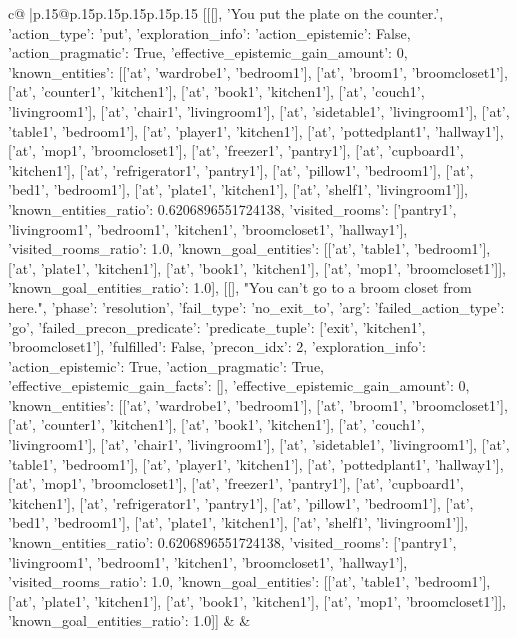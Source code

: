 \documentclass{article}
\begin{document}
{\begin{supertabular}{c@{$\;$}|p{.15\linewidth}@{}p{.15\linewidth}p{.15\linewidth}p{.15\linewidth}p{.15\linewidth}p{.15\linewidth}}
{{{	 [[[], 'You put the plate on the counter.', {'action_type': 'put', 'exploration_info': {'action_epistemic': False, 'action_pragmatic': True, 'effective_epistemic_gain_amount': 0, 'known_entities': [['at', 'wardrobe1', 'bedroom1'], ['at', 'broom1', 'broomcloset1'], ['at', 'counter1', 'kitchen1'], ['at', 'book1', 'kitchen1'], ['at', 'couch1', 'livingroom1'], ['at', 'chair1', 'livingroom1'], ['at', 'sidetable1', 'livingroom1'], ['at', 'table1', 'bedroom1'], ['at', 'player1', 'kitchen1'], ['at', 'pottedplant1', 'hallway1'], ['at', 'mop1', 'broomcloset1'], ['at', 'freezer1', 'pantry1'], ['at', 'cupboard1', 'kitchen1'], ['at', 'refrigerator1', 'pantry1'], ['at', 'pillow1', 'bedroom1'], ['at', 'bed1', 'bedroom1'], ['at', 'plate1', 'kitchen1'], ['at', 'shelf1', 'livingroom1']], 'known_entities_ratio': 0.6206896551724138, 'visited_rooms': ['pantry1', 'livingroom1', 'bedroom1', 'kitchen1', 'broomcloset1', 'hallway1'], 'visited_rooms_ratio': 1.0, 'known_goal_entities': [['at', 'table1', 'bedroom1'], ['at', 'plate1', 'kitchen1'], ['at', 'book1', 'kitchen1'], ['at', 'mop1', 'broomcloset1']], 'known_goal_entities_ratio': 1.0}}], [[], "You can't go to a broom closet from here.", {'phase': 'resolution', 'fail_type': 'no_exit_to', 'arg': {'failed_action_type': 'go', 'failed_precon_predicate': {'predicate_tuple': ['exit', 'kitchen1', 'broomcloset1'], 'fulfilled': False, 'precon_idx': 2}}, 'exploration_info': {'action_epistemic': True, 'action_pragmatic': True, 'effective_epistemic_gain_facts': [], 'effective_epistemic_gain_amount': 0, 'known_entities': [['at', 'wardrobe1', 'bedroom1'], ['at', 'broom1', 'broomcloset1'], ['at', 'counter1', 'kitchen1'], ['at', 'book1', 'kitchen1'], ['at', 'couch1', 'livingroom1'], ['at', 'chair1', 'livingroom1'], ['at', 'sidetable1', 'livingroom1'], ['at', 'table1', 'bedroom1'], ['at', 'player1', 'kitchen1'], ['at', 'pottedplant1', 'hallway1'], ['at', 'mop1', 'broomcloset1'], ['at', 'freezer1', 'pantry1'], ['at', 'cupboard1', 'kitchen1'], ['at', 'refrigerator1', 'pantry1'], ['at', 'pillow1', 'bedroom1'], ['at', 'bed1', 'bedroom1'], ['at', 'plate1', 'kitchen1'], ['at', 'shelf1', 'livingroom1']], 'known_entities_ratio': 0.6206896551724138, 'visited_rooms': ['pantry1', 'livingroom1', 'bedroom1', 'kitchen1', 'broomcloset1', 'hallway1'], 'visited_rooms_ratio': 1.0, 'known_goal_entities': [['at', 'table1', 'bedroom1'], ['at', 'plate1', 'kitchen1'], ['at', 'book1', 'kitchen1'], ['at', 'mop1', 'broomcloset1']], 'known_goal_entities_ratio': 1.0}}]] 
	  } 
	   } 
	   } 
	 & & \\ 
 


\end{supertabular}}
\end{document}
